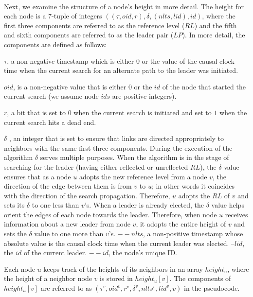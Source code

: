 \paragraph{}Next, we examine the structure of a node’s height in more detail. The height for each node is a 7-tuple of integers $((\tau , oid, r), \delta , (nlts, lid), id)$, where the first three components are referred to as the reference level ($RL$) and the fifth and sixth components are referred to as the leader pair ($LP$). In more detail, the components are defined as follows:
\begin{list}{--}{spacing}
	\item $\tau$, a non-negative timestamp which is either $0$ or the value of the causal clock time when the current search for an alternate path to the leader was initiated.
	\item $oid$, is a non-negative value that is either $0$ or the $id$ of the node that started the current search (we assume node $ids$ are positive integers).
	\item $r$, a bit that is set to $0$ when the current search is initiated and set to $1$ when the current search hits a dead end.
	\item  $\delta$ , an integer that is set to ensure that links are directed appropriately to neighbors with the same first three components. During the execution of the algorithm $\delta$ serves multiple purposes. When the algorithm is in the stage of searching for the leader (having either reflected or unreflected $RL$), the $\delta$ value ensures that as a node $u$ adopts the new reference level from a node $v$, the direction of the edge between them is from $v$ to $u$; in other words it coincides with the direction of the search propagation. Therefore, $u$ adopts the $RL$ of $v$ and sets its $\delta$ to one less than $v$’s. When a leader is already elected, the $\delta$ value helps orient the edges of each node towards the leader. Therefore, when node $u$ receives information about a new leader from node $v$, it adopts the entire height of $v$ and sets the $\delta$ value to one more than $v$’s. $-- nlts$, a non-positive timestamp whose absolute value is the causal clock time when the current leader was elected. $– lid$, the $id$ of the current leader. $-- id$, the node’s unique ID.
\end{list}
Each node $u$ keeps track of the heights of its neighbors in an array $height_u$, where the height of a neighbor node $v$ is stored in $height_u[v]$. The components of $height_u[v]$ are referred to as $(\tau ^v , oid^v , r^v , \delta ^v , nlts^v , lid^v , v)$ in the pseudocode.
